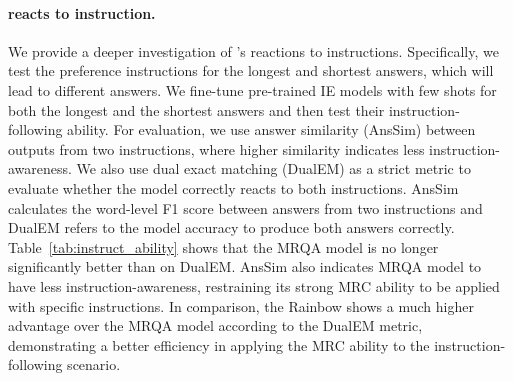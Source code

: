 \paragraph{\our reacts to instruction.} We provide a deeper investigation of \our's reactions to instructions. Specifically, we test the preference instructions for the longest and shortest answers, which will lead to different answers. We fine-tune pre-trained IE models with few shots for both the longest and the shortest answers and then test their instruction-following ability. For evaluation, we use answer similarity (AnsSim) between outputs from two instructions, where higher similarity indicates less instruction-awareness. We also use dual exact matching (DualEM) as a strict metric to evaluate whether the model correctly reacts to both instructions. AnsSim calculates the word-level F1 score between answers from two instructions and DualEM refers to the model accuracy to produce both answers correctly. Table~\ref{tab:instruct_ability} shows that the MRQA model is no longer significantly better than \our on DualEM. AnsSim also indicates MRQA model to have less instruction-awareness, restraining its strong MRC ability to be applied with specific instructions. In comparison, the Rainbow \our shows a much higher advantage over the MRQA model according to the DualEM metric, demonstrating a better efficiency in applying the MRC ability to the instruction-following scenario. 

